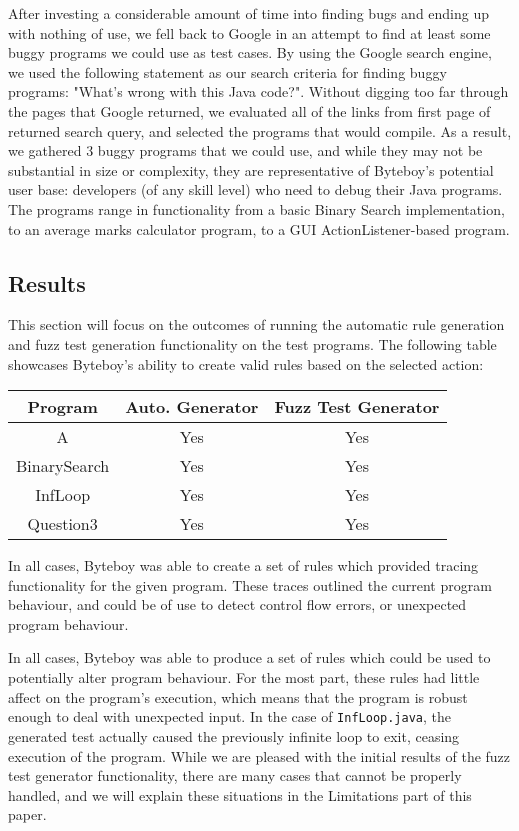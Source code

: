 \documentclass[letterpaper,twocolumn,10pt]{article}
\begin{document}
After investing a considerable amount of time into finding bugs and ending up with nothing of use, we fell back to Google in an attempt to find at least some buggy programs we could use as test cases. By using the Google search engine, we used the following statement as our search criteria for finding buggy programs: "What's wrong with this Java code?". Without digging too far through the pages that Google returned, we evaluated all of the links from first page of returned search query, and selected the programs that would compile. As a result, we gathered 3 buggy programs that we could use, and while they may not be substantial in size or complexity, they are representative of Byteboy's potential user base: developers (of any skill level) who need to debug their Java programs. The programs range in functionality from a basic Binary Search implementation, to an average marks calculator program, to a GUI ActionListener-based program.

\subsection{Results}

This section will focus on the outcomes of running the automatic rule generation and fuzz test generation functionality on the test programs. The following table showcases Byteboy's ability to create valid rules based on the selected action:
\begin{center}
 \begin{tabular}{||c | c | c||} 
 \hline
 Program & Auto. Generator & Fuzz Test Generator\\ [0.5ex] 
 \hline\hline
 A & Yes & Yes\\ 
 \hline
 BinarySearch & Yes & Yes\\
 \hline
 InfLoop & Yes & Yes\\
 \hline
 Question3 & Yes & Yes\\ [1ex] 
 \hline
\end{tabular}
\end{center}

In all cases, Byteboy was able to create a set of rules which provided tracing functionality for the given program. These traces outlined the current program behaviour, and could be of use to detect control flow errors, or unexpected program behaviour.

In all cases, Byteboy was able to produce a set of rules which could be used to potentially alter program behaviour. For the most part, these rules had little affect on the program's execution, which means that the program is robust enough to deal with unexpected input. In the case of {\tt InfLoop.java}, the generated test actually caused the previously infinite loop to exit, ceasing execution of the program. While we are pleased with the initial results of the fuzz test generator functionality, there are many cases that cannot be properly handled, and we will explain these situations in the Limitations part of this paper. 
\end{document}
